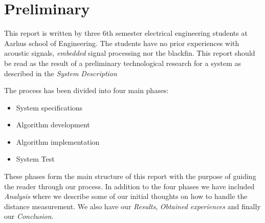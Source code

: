 \chapter{Preliminary}
This report is written by three 6th semester electrical engineering students at Aarhus school of Engineering. The students have no prior experiences with acoustic signals, \textit{embedded} signal processing nor the blackfin. This report should be read as the result of a preliminary technological research for a system as described in the \textit{System Description}

The process has been divided into four main phases:
\begin{itemize}
\item System specifications
\item Algorithm development
\item Algorithm implementation
\item System Test
\end{itemize}

These phases form the main structure of this report with the purpose of guiding the reader through our process. In addition to the four phases we have included \textit{Analysis} where we describe some of our initial thoughts on how to handle the distance measurement. We also have our \textit{Results}, \textit{Obtained experiences} and finally our \textit{Conclusion}.

